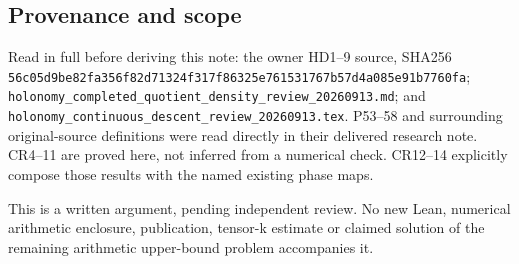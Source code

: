 \subsection{Provenance and scope}\label{provenance-and-scope}

Read in full before deriving this note: the owner HD1--9 source, SHA256 \texttt{56c05d9be82fa356f82d71324f317f86325e761531767b57d4a085e91b7760fa}; \texttt{holonomy\_completed\_quotient\_density\_review\_20260913.md}; and \texttt{holonomy\_continuous\_descent\_review\_20260913.tex}. P53--58 and surrounding original-source definitions were read directly in their delivered research note. CR4--11 are proved here, not inferred from a numerical check. CR12--14 explicitly compose those results with the named existing phase maps.

This is a written argument, pending independent review. No new Lean, numerical arithmetic enclosure, publication, tensor-k estimate or claimed solution of the remaining arithmetic upper-bound problem accompanies it.
